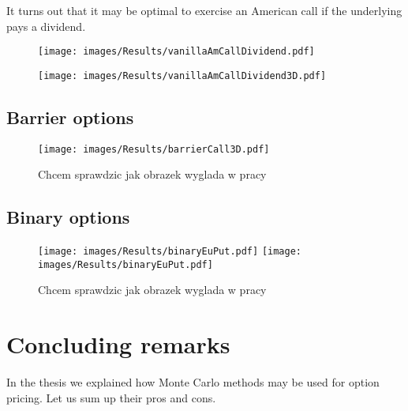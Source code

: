 \documentclass[a4paper,11pt, twoside]{book}
\theoremstyle{definition}
\theoremstyle{remark}
\begin{document}
It turns out that it may be optimal to exercise an American call if the underlying pays a dividend. 

\begin{figure}
\centering
 \texttt{[image: images/Results/vanillaAmCallDividend.pdf]}
\caption{}
\label{fig:results:vanillaAmCallDividend}
\end{figure}

\begin{figure}
\centering
 \texttt{[image: images/Results/vanillaAmCallDividend3D.pdf]}
\caption{}
\label{fig:results:vanillaAmCallDividend3D}
\end{figure}

\section{Barrier options}
\begin{figure}[!ht]
\centering
 \texttt{[image: images/Results/barrierCall3D.pdf]}
\caption{Chcem sprawdzic jak obrazek wyglada w pracy}
\label{fig:results:dupa2}
\end{figure}

\section{Binary options}
\begin{figure}[!ht]
\centering
 \texttt{[image: images/Results/binaryEuPut.pdf]}
 \texttt{[image: images/Results/binaryEuPut.pdf]}
\caption{Chcem sprawdzic jak obrazek wyglada w pracy}
\label{fig:results:dupa3}
\end{figure}

\chapter*{Concluding remarks}
In the thesis we explained how Monte Carlo methods may be used for option pricing. Let us sum up their pros and cons.
\end{document}
